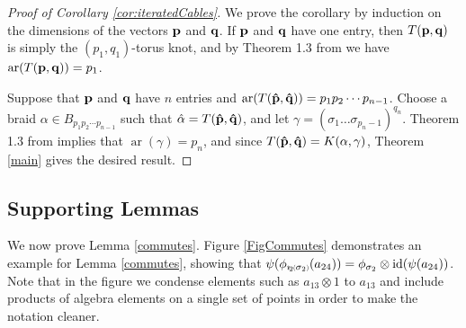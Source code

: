 \documentclass[11pt]{amsart}
\def\s{{\sigma}}
\def\ar{\operatorname{ar}}
\newcommand*{\subsmallp}[1]{\scalebox{.5}{\ensuremath#1}}
\newcommand{\subpp}[2][p]{\imath_{\hspace*{-1pt}#1}\hspace*{-.5pt}\subsmallp(#2\subsmallp)}
\newcommand\id{\operatorname{id}}
\theoremstyle{definition}
\begin{document}
\begin{proof}[Proof of Corollary \ref{cor:iteratedCables}]
We prove the corollary by induction on the dimensions of the vectors ${\bf p}$ and ${\bf q}$.  If ${\bf p}$ and ${\bf q}$ have one entry, then $T({\bf p},{\bf q})$ is simply the $(p_1,q_1)$-torus knot, and by Theorem 1.3 from \cite{Cor13b} we have $\ar(T({\bf p},{\bf q})) = p_1$.

Suppose that ${\bf p}$ and ${\bf q}$ have $n$ entries and $\ar(T({\bf \hat p},{\bf \hat q})) = p_1p_2\cdots p_{n-1}$.  Choose a braid $\alpha\in B_{p_1p_2\cdots p_{n-1}}$ such that $\hat\alpha = T({\bf \hat p},{\bf \hat q})$, and let $\gamma = (\sigma_1\ldots \sigma_{p_n-1})^{q_n}$.  Theorem 1.3 from \cite{Cor13b} implies that $\ar(\gamma) = p_n$, and since $T({\bf \hat p},{\bf \hat q}) = K(\alpha,\gamma)$, Theorem \ref{main} gives the desired result.
\end{proof}


\subsection{Supporting Lemmas}
\label{PropAndLemmas}

\noindent We now prove Lemma \ref{commutes}.  Figure \ref{FigCommutes} demonstrates an example for Lemma \ref{commutes}, showing that $\psi(\phi_{\subpp[2]{\s_2}}(a_{24})) = \phi_{\s_2}\otimes\id(\psi(a_{24}))$.  Note that in the figure we condense elements such as $a_{13}\otimes 1$ to $a_{13}$ and include products of algebra elements on a single set of points in order to make the notation cleaner.
\end{document}
